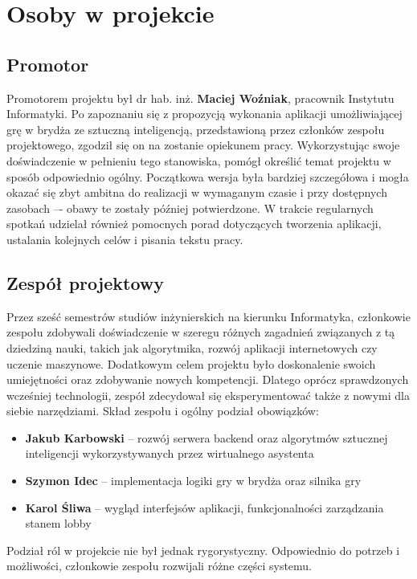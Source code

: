 \section{Osoby w projekcie}

\subsection{Promotor}

Promotorem projektu był dr hab. inż. \textbf{Maciej Woźniak}, pracownik Instytutu Informatyki. 
Po zapoznaniu się z propozycją wykonania aplikacji umożliwiającej grę w brydża ze sztuczną 
inteligencją, przedstawioną przez członków zespołu projektowego, zgodził się on na zostanie 
opiekunem pracy. Wykorzystując swoje doświadczenie w pełnieniu tego stanowiska, pomógł określić 
temat projektu w sposób odpowiednio ogólny. Początkowa wersja była bardziej szczegółowa i mogła 
okazać się zbyt ambitna do realizacji w wymaganym czasie i przy dostępnych zasobach –- obawy te   
zostały później potwierdzone. W trakcie regularnych spotkań udzielał również pomocnych porad dotyczących 
tworzenia aplikacji, ustalania kolejnych celów i pisania tekstu pracy.

\subsection{Zespół projektowy}
Przez sześć semestrów studiów inżynierskich na kierunku Informatyka, członkowie zespołu zdobywali 
doświadczenie w szeregu różnych zagadnień związanych z tą dziedziną nauki, takich jak algorytmika, 
rozwój aplikacji internetowych czy uczenie maszynowe. Dodatkowym celem projektu było doskonalenie 
swoich umiejętności oraz zdobywanie nowych kompetencji. Dlatego oprócz sprawdzonych wcześniej technologii, 
zespół zdecydował się eksperymentować także z nowymi dla siebie narzędziami.
Skład zespołu i ogólny podział obowiązków:
\begin{itemize}
  \item \textbf{Jakub Karbowski} -- rozwój serwera backend oraz algorytmów sztucznej inteligencji 
  wykorzystywanych przez wirtualnego asystenta
  \item \textbf{Szymon Idec} -- implementacja logiki gry w brydża oraz silnika gry 
  \item \textbf{Karol Śliwa} -- wygląd interfejsów aplikacji, funkcjonalności zarządzania stanem lobby 
\end{itemize}
Podział ról w projekcie nie był jednak rygorystyczny. Odpowiednio do potrzeb i możliwości, 
członkowie zespołu rozwijali różne części systemu.



